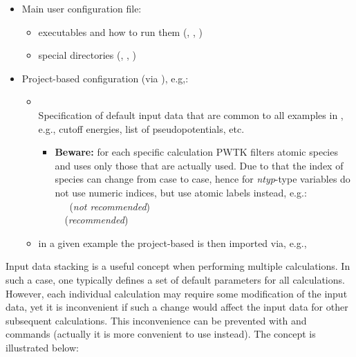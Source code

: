 \documentclass[landscape]{foils}
\begin{document}
\rightheader{}

\begin{itemize}
\item Main user configuration file: 
  \begin{itemize}
  \item executables and how to run them (, ,
    )
  \item special directories (, , )
  \end{itemize}
\item Project-based configuration (via ), e.g,:  
  \begin{itemize}
  \item {}\\[0.3em]
    Specification of default input data that are common to all examples in
    , e.g., cutoff energies, list of
    pseudopotentials, etc.
    \vspace{0.5em}
    {\small
      \begin{itemize}
      \item {\bf Beware:} for each specific calculation PWTK filters atomic
        species and uses only those that are actually used. Due to that
        the index of species can change from case to case, hence for
        {\em ntyp}-type variables do not use numeric indices, but use
        atomic labels instead, e.g.:\\
         ~~~({\red\em not recommended})\\
         ~~({\green\em recommended})
      \end{itemize}
    }
    \vspace{0.5em}
  \item in a given example the project-based  is
    then imported via, e.g.,
  \end{itemize}
\end{itemize}

\rightheader{}

{\small Input data stacking is a useful concept when performing
  multiple calculations. In such a case, one typically defines a set
  of default parameters for all calculations. However, each individual
  calculation may require some modification of the input data, yet it
  is inconvenient if such a change would affect the input data for
  other subsequent calculations.
  This inconvenience can be prevented with  and 
  commands (actually it is more convenient to use  instead). The concept is illustrated below:}
\end{document}
